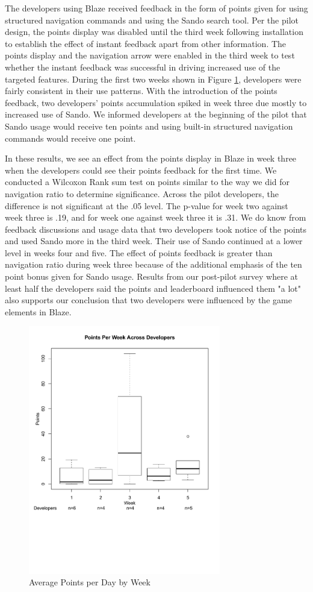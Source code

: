 \documentclass{sig-alternate}
\begin{document}
The developers using Blaze received feedback in the form of points given for using structured navigation commands and using the Sando search tool\cite{Shepherd2012Sando}.  Per the pilot design, the points display was disabled until the third week following installation to establish the effect of instant feedback apart from other information.  The points display and the navigation arrow were enabled in the third week to test whether the instant feedback was successful in driving increased use of the targeted features. During the first two weeks shown in Figure \ref{fig:pointsbyweek}, developers were fairly consistent in their use patterns.  With the introduction of the points feedback, two developers' points accumulation spiked in week three due mostly to increased use of Sando.   We informed developers at the beginning of the pilot that Sando usage would receive ten points and using built-in structured navigation commands would receive one point.  

In these results, we see an effect from the points display in Blaze in week three when the developers could see their points feedback for the first time.  We conducted a Wilcoxon Rank sum test on points similar to the way we did for navigation ratio to determine significance.  Across the pilot developers, the difference is not significant at the .05 level. The p-value for week two against week three is .19, and for week one against week three it is .31.  We do know from feedback discussions and usage data that two developers took notice of the points and used Sando more in the third week.  Their use of Sando continued at a lower level in weeks four and five.   The effect of points feedback is greater than navigation ratio during week three because of the additional emphasis of the ten point bonus given for Sando usage.  Results from our post-pilot survey where at least half the developers said the points and leaderboard influenced them "a lot" also supports our conclusion that two developers were influenced by the game elements in Blaze.  

\begin{figure}
	\includegraphics[width=3.3in]{pointsbyweek_ann.pdf}
	\caption{Average Points per Day by Week}
	\label{fig:pointsbyweek}
\end{figure}
\end{document}
